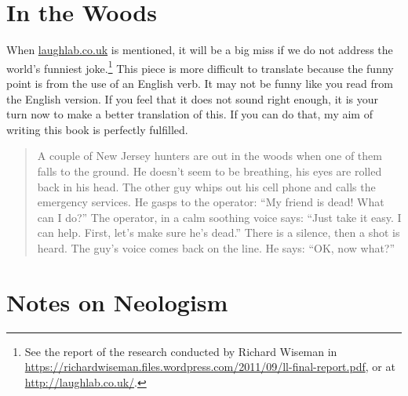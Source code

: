 {}
\section*{In the Woods}

When \url{laughlab.co.uk} is mentioned, it will be a big miss if we do not address the world's funniest joke.\footnote{See the report of the research conducted by Richard Wiseman in \url{https://richardwiseman.files.wordpress.com/2011/09/ll-final-report.pdf}, or at \url{http://laughlab.co.uk/}.} This piece is more difficult to translate because the funny point is from the use of an English verb. It may not be funny like you read from the English version. If you feel that it does not sound right enough, it is your turn now to make a better translation of this. If you can do that, my aim of writing this book is perfectly fulfilled.

\begin{quote}
\end{quote}

\begin{quote}
A couple of New Jersey hunters are out in the woods when one of them falls to the ground. He doesn't seem to be breathing, his eyes are rolled 
back in his head. The other guy whips out his cell phone and calls the emergency services. He gasps to the operator: ``My friend is dead! What can I do?'' The operator, in a calm soothing voice says: ``Just take it easy. I can help. First, let's make sure he's dead.'' There is a silence, then a shot is heard. The guy's voice comes back on the line. He says: ``OK, now what?''
\end{quote}

{}
\section*{Notes on Neologism}\label{sec:neologism}

